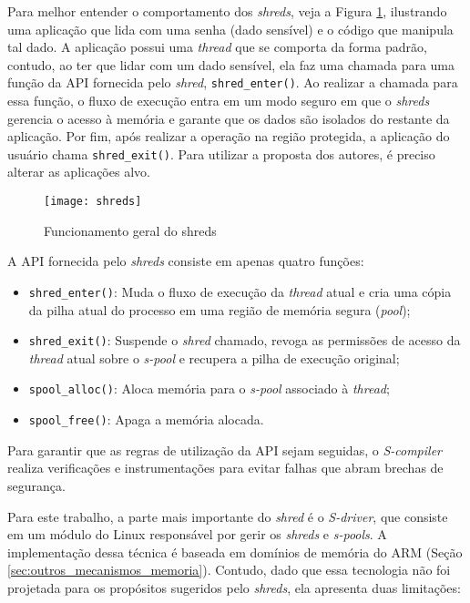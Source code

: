 Para melhor entender o comportamento dos \emph{shreds}, veja a Figura
\ref{fig:shreds}, ilustrando uma aplicação que lida com uma senha (dado
sensível) e o código que manipula tal dado. A aplicação possui uma \emph{thread} que
se comporta da forma padrão, contudo, ao ter que lidar com um dado sensível, ela
faz uma chamada para uma função da API fornecida pelo \emph{shred},
\texttt{shred\_enter()}. Ao realizar a chamada para essa função, o fluxo de
execução entra em um modo seguro em que o \emph{shreds} gerencia o acesso à
memória e garante que os dados são isolados do restante da aplicação. Por fim,
após realizar a operação na região protegida, a aplicação do usuário chama
\texttt{shred\_exit()}. Para utilizar a proposta dos autores, é preciso alterar
as aplicações alvo.

\begin{figure}[!h]
  \centering
  \texttt{[image: shreds]} 
  \caption{Funcionamento geral do shreds}
  \label{fig:shreds}
\end{figure}

A API fornecida pelo \emph{shreds} consiste em apenas quatro funções:

\begin{itemize}
  \item \texttt{shred\_enter()}: Muda o fluxo de execução da \emph{thread} atual e
        cria uma cópia da pilha atual do processo em uma região de memória
        segura (\emph{pool});
  \item \texttt{shred\_exit()}: Suspende o \emph{shred} chamado, revoga as permissões
        de acesso da \emph{thread} atual sobre o \textit{s-pool} e recupera a pilha de execução
        original;
  \item \texttt{spool\_alloc()}: Aloca memória para o \emph{s-pool} associado à
        \emph{thread};
  \item \texttt{spool\_free()}: Apaga a memória alocada.
\end{itemize}

Para garantir que as regras de utilização da API sejam seguidas, o
\emph{S-compiler} realiza verificações e instrumentações para evitar falhas que
abram brechas de segurança.

Para este trabalho, a parte mais importante do \emph{shred} é o \emph{S-driver},
que consiste em um módulo do Linux responsável por gerir os \emph{shreds} e
\emph{s-pools}. A implementação dessa técnica é baseada em domínios de memória
do ARM (Seção \ref{sec:outros_mecanismos_memoria}). Contudo, dado que essa
tecnologia não foi projetada para os propósitos sugeridos pelo \emph{shreds},
ela apresenta duas limitações:

